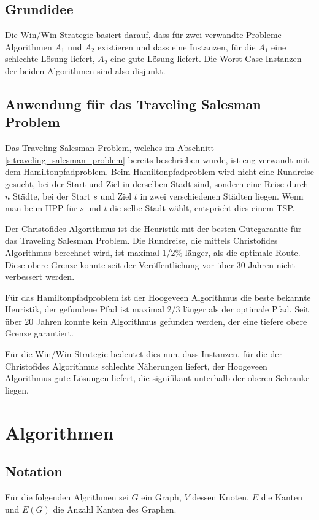 \documentclass[11pt,a4paper]{article}
\begin{document}
\subsection{Grundidee}
Die Win/Win Strategie basiert darauf, dass für zwei verwandte Probleme Algorithmen $A_1$ und $A_2$ existieren und dass eine Instanzen, für die $A_1$ eine schlechte Lösung liefert, $A_2$ eine gute Lösung liefert. Die Worst Case Instanzen der beiden Algorithmen sind also disjunkt.

\subsection{Anwendung für das Traveling Salesman Problem}
Das Traveling Salesman Problem, welches im Abschnitt \ref{s:traveling_salesman_problem} bereits beschrieben wurde, ist eng verwandt mit dem Hamiltonpfadproblem. Beim Hamiltonpfadproblem wird nicht eine Rundreise gesucht, bei der Start und Ziel in derselben Stadt sind, sondern eine Reise durch $n$ Städte, bei der Start $s$ und Ziel $t$ in zwei verschiedenen Städten liegen. Wenn man beim HPP für $s$ und $t$ die selbe Stadt wählt, entspricht dies einem TSP.

Der Christofides Algorithmus ist die Heuristik mit der besten Gütegarantie für das Traveling Salesman Problem. Die Rundreise, die mittels Christofides Algorithmus berechnet wird, ist maximal 1/2\% länger, als die optimale Route. Diese obere Grenze konnte seit der Veröffentlichung vor über 30 Jahren nicht verbessert werden.

Für das Hamiltonpfadproblem ist der Hoogeveen Algorithmus die beste bekannte Heuristik, der gefundene Pfad ist maximal 2/3 länger als der optimale Pfad. Seit über 20 Jahren konnte kein Algorithmus gefunden werden, der eine tiefere obere Grenze garantiert.\cite{moemke11}

Für die Win/Win Strategie bedeutet dies nun, dass Instanzen, für die der Christofides Algorithmus schlechte Näherungen liefert, der Hoogeveen Algorithmus gute Lösungen liefert, die signifikant unterhalb der oberen Schranke liegen.

\newpage
\section{Algorithmen}
\label{s:algorithmen}
\subsection{Notation}
Für die folgenden Algrithmen sei $G$ ein Graph, $V$ dessen Knoten, $E$ die Kanten und $E(G)$ die Anzahl Kanten des Graphen.
\end{document}
